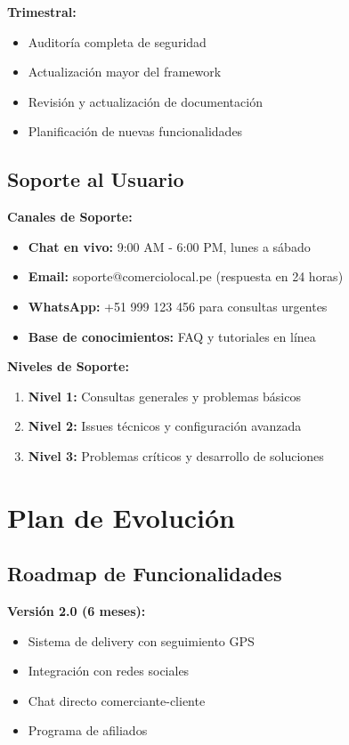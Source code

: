 \documentclass[12pt,a4paper]{report}
\begin{document}
\textbf{Trimestral:}
\begin{itemize}
	\item Auditoría completa de seguridad
	\item Actualización mayor del framework
	\item Revisión y actualización de documentación
	\item Planificación de nuevas funcionalidades
\end{itemize}

\subsection{Soporte al Usuario}

\textbf{Canales de Soporte:}
\begin{itemize}
	\item \textbf{Chat en vivo:} 9:00 AM - 6:00 PM, lunes a sábado
	\item \textbf{Email:} soporte@comerciolocal.pe (respuesta en 24 horas)
	\item \textbf{WhatsApp:} +51 999 123 456 para consultas urgentes
	\item \textbf{Base de conocimientos:} FAQ y tutoriales en línea
\end{itemize}

\textbf{Niveles de Soporte:}
\begin{enumerate}
	\item \textbf{Nivel 1:} Consultas generales y problemas básicos
	\item \textbf{Nivel 2:} Issues técnicos y configuración avanzada
	\item \textbf{Nivel 3:} Problemas críticos y desarrollo de soluciones
\end{enumerate}

\section{Plan de Evolución}

\subsection{Roadmap de Funcionalidades}

\textbf{Versión 2.0 (6 meses):}
\begin{itemize}
	\item Sistema de delivery con seguimiento GPS
	\item Integración con redes sociales
	\item Chat directo comerciante-cliente
	\item Programa de afiliados
\end{itemize}
\end{document}

